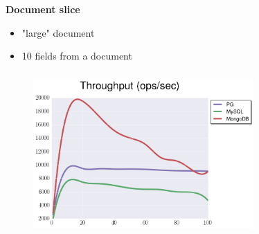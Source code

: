 \documentclass[usenames,dvipsnames, 18pt, compress, aspectratio=169]{beamer}
\begin{document}
\begin{frame}
    \frametitle{}
    \begin{center}
        \textbf{Document slice}
        \begin{itemize}[label={}]
            \item "large" document
            \item 10 fields from a document
        \end{itemize}
    \end{center}
\end{frame}

\begin{frame}
    \frametitle{}
    \begin{center}
    \begin{figure}
        \includegraphics[width=0.75\textwidth,center]{benchmarks/select_slice_10_btree_throughput.png}
    \end{figure}
    \end{center}
\end{frame}

%
\begin{frame}
    \frametitle{}
\end{frame}
\end{document}
